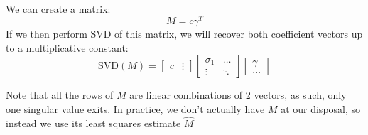 {\begin{equation}
\begin{aligned}
    \end{aligned}
\end{equation}

We can create a matrix:
\begin{equation}
    M = c \gamma^{T}
\end{equation}
If we then perform SVD of this matrix, we will recover both coefficient vectors up to a multiplicative constant:
\begin{equation}
    \text{SVD}(M) = \begin{bmatrix}  c & \vdots  
    \end{bmatrix} \begin{bmatrix}
        \sigma_1 & \dots  \\
        \vdots & \ddots
    \end{bmatrix}
    \begin{bmatrix}
        \gamma   \\
        \dots
    \end{bmatrix}
\end{equation}

Note that all the rows of $M$ are linear combinations of 2 vectors, as such, only one singular value exits.
In practice, we don't actually have $M$ at our disposal, so instead we use its least squares estimate $\hat{M}$





}
